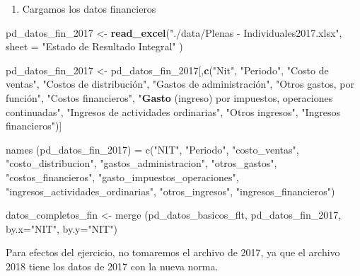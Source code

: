 \documentclass[
  11pt,
  a4paper,
]{book}
\newenvironment{Shaded}{\begin{snugshade}}{\end{snugshade}}
\newcommand{\DataTypeTok}[1]{\textcolor[rgb]{0.13,0.29,0.53}{#1}}
\newcommand{\DecValTok}[1]{\textcolor[rgb]{0.00,0.00,0.81}{#1}}
\newcommand{\KeywordTok}[1]{\textcolor[rgb]{0.13,0.29,0.53}{\textbf{#1}}}
\newcommand{\NormalTok}[1]{#1}
\newcommand{\StringTok}[1]{\textcolor[rgb]{0.31,0.60,0.02}{#1}}
\providecommand{\tightlist}{%
  \setlength{\itemsep}{0pt}\setlength{\parskip}{0pt}}
\begin{document}
\begin{enumerate}
\def\labelenumi{\arabic{enumi}.}
\setcounter{enumi}{2}
\tightlist
\item
  Cargamos los datos financieros
\end{enumerate}

\begin{Shaded}
\begin{Highlighting}[]
\NormalTok{pd_datos_fin_}\DecValTok{2017}\NormalTok{ <-}\StringTok{ }\KeywordTok{read_excel}\NormalTok{(}\StringTok{"./data/Plenas - Individuales2017.xlsx"}\NormalTok{, }
                                \DataTypeTok{sheet =} \StringTok{"Estado de Resultado Integral"}\NormalTok{ )}

\NormalTok{pd_datos_fin_}\DecValTok{2017}\NormalTok{ <-}\StringTok{ }\NormalTok{pd_datos_fin_}\DecValTok{2017}\NormalTok{[,}\KeywordTok{c}\NormalTok{(}\StringTok{"Nit"}\NormalTok{, }\StringTok{"Periodo"}\NormalTok{, }\StringTok{"Costo de ventas"}\NormalTok{,  }
\StringTok{"Costos de distribución", "}\NormalTok{Gastos de administración", }\StringTok{"Otros gastos, por función",}
\StringTok{"}\NormalTok{Costos financieros}\StringTok{", "}\KeywordTok{Gasto}\NormalTok{ (ingreso) por impuestos, operaciones continuadas}\StringTok{",}
\StringTok{"}\NormalTok{Ingresos de actividades ordinarias}\StringTok{", "}\NormalTok{Otros ingresos}\StringTok{", "}\NormalTok{Ingresos financieros}\StringTok{")]}


\StringTok{names (pd_datos_fin_2017) = c("}\NormalTok{NIT}\StringTok{", "}\NormalTok{Periodo}\StringTok{", "}\NormalTok{costo_ventas}\StringTok{",  }
\StringTok{  "}\NormalTok{costo_distribucion}\StringTok{", "}\NormalTok{gastos_administracion}\StringTok{", "}\NormalTok{otros_gastos}\StringTok{", }
\StringTok{  "}\NormalTok{costos_financieros}\StringTok{", "}\NormalTok{gasto_impuestos_operaciones}\StringTok{", }
\StringTok{  "}\NormalTok{ingresos_actividades_ordinarias}\StringTok{", "}\NormalTok{otros_ingresos}\StringTok{", "}\NormalTok{ingresos_financieros}\StringTok{")}


\StringTok{datos_completos_fin <- merge (pd_datos_basicos_flt, pd_datos_fin_2017, }
\StringTok{                              by.x="}\NormalTok{NIT}\StringTok{", by.y="}\NormalTok{NIT}\StringTok{")}
\end{Highlighting}
\end{Shaded}

Para efectos del ejercicio, no tomaremos el archivo de 2017, ya que el
archivo 2018 tiene los datos de 2017 con la nueva norma.
\end{document}
